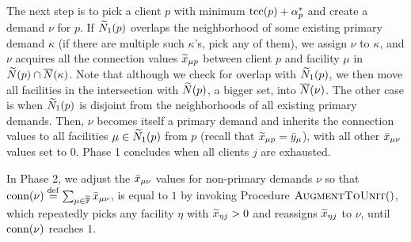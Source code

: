 \documentclass{llncs}
\begin{document}
The next step is to pick a client $p$ with minimum
$\textrm{tcc}(p)+\alpha_p^\ast$ and create a demand $\nu$ for $p$. If
${\widetilde N}_1(p)$ overlaps the neighborhood of some existing primary
demand $\kappa$ (if there are multiple such $\kappa$'s, pick any of
them), we assign $\nu$ to $\kappa$, and $\nu$ acquires all the
connection values ${\widetilde x}_{\mu p}$ between client $p$ and facility
$\mu$ in ${\widetilde N}(p)\cap {\overline{N}}(\kappa)$. Note that although we check
for overlap with ${\widetilde N}_1(p)$, we then move all facilities in the
intersection with ${\widetilde N}(p)$, a bigger set, into ${\overline{N}}(\nu)$.
The other case is when ${\widetilde N}_1(p)$ is disjoint from the
neighborhoods of all existing primary demands. Then, $\nu$ becomes
itself a primary demand and inherits the connection values to all
facilities $\mu\in{\widetilde N}_1(p)$ from $p$ (recall that ${\widetilde x}_{\mu
  p} = {\bar y}_{\mu}$), with all other ${\bar x}_{\mu\nu}$ values set to
$0$. Phase 1 concludes when all clients $j$ are exhausted.

In Phase 2, we adjust the ${\bar x}_{\mu\nu}$ values for non-primary
demands $\nu$ so that ${\textrm{conn}}(\nu) \stackrel{\mathrm{def}}{=}
\sum_{\mu\in\overline{\mathbb{F}}}{\bar x}_{\mu \nu}$, is equal to $1$ by invoking
Procedure ${\textsc{AugmentToUnit}}()$, which repeatedly picks any facility
$\eta$ with ${\widetilde x}_{\eta j} >0$ and reassigns ${\widetilde x}_{\eta j}$ to
$\nu$, until ${\textrm{conn}}(\nu)$ reaches $1$.

\end{document}
